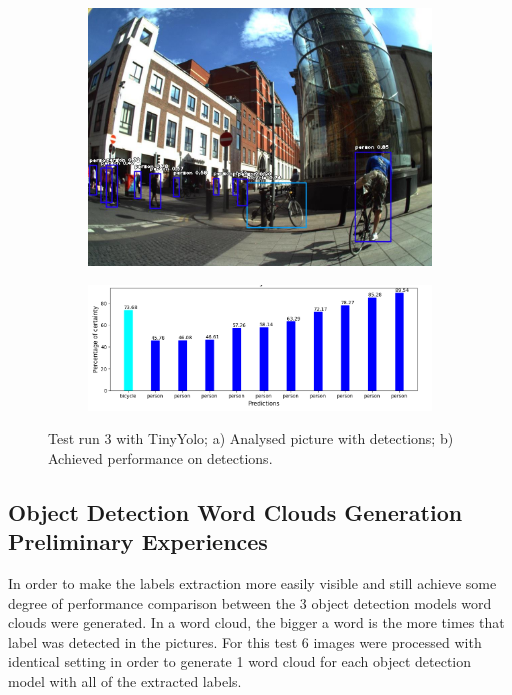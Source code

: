           \begin{figure}[H]
            \centering
            \captionsetup{justification=centering}
    
            \begin{subfigure}{0.29\textwidth}
            \includegraphics[width=\textwidth]{Sections/4InitialWork/4_images_obj_run4/yolo_tiny.jpg} 
            \caption{}
            \end{subfigure}
            \begin{subfigure}{0.65\textwidth}
            \includegraphics[width=\textwidth]{Sections/4InitialWork/4_images_obj_run4/tiny_yolo_graph.png}
            \caption{}
            \end{subfigure}
            
            \caption[Test run 3 with TinyYolo]{ 
            Test run 3 with TinyYolo; a) Analysed picture with detections; b) Achieved performance on detections. }
            \label{fig:tiny_3}
            \end{figure}


    \newpage

    \subsection{Object Detection Word Clouds Generation Preliminary Experiences}
    \label{ch:wordclouds}
    In order to make the labels extraction more easily visible and still achieve some degree of performance comparison between the 3 object detection models word clouds were generated. In a word cloud, the bigger a word is the more times that label was detected in the pictures. For this test 6 images were processed with identical setting in order to generate 1 word cloud for each object detection model with all of the extracted labels.

